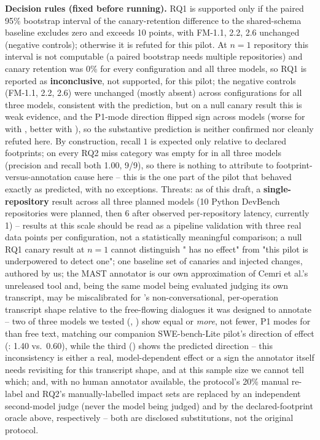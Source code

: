 \noindent\textbf{Decision rules (fixed before running).} RQ1 is supported only
if the paired 95\% bootstrap interval of the canary-retention difference to the
shared-schema baseline excludes zero and exceeds 10 points, with FM-1.1,
2.2, 2.6 unchanged (negative controls); otherwise it is refuted for this
pilot. At $n=1$ repository this interval is not computable (a paired
bootstrap needs multiple repositories) and canary retention was 0\% for
every configuration and all three models, so RQ1 is reported as
\textbf{inconclusive}, not supported, for this pilot; the negative controls
(FM-1.1, 2.2, 2.6) were unchanged (mostly absent) across configurations for
all three models, consistent with the prediction, but on a null canary
result this is weak evidence, and the P1-mode direction flipped sign
across models (worse for \tool{} with , better with
), so the substantive prediction is neither
confirmed nor cleanly refuted here. By construction, recall $1$ is
expected only relative to declared footprints; on  every
RQ2 miss category was empty for \tool{} in all three models (precision and
recall both 1.00, 9/9), so there is nothing to attribute to
footprint-versus-annotation cause here -- this is the one part of the
pilot that behaved exactly as predicted, with no exceptions. Threats: as
of this draft, a \textbf{single-repository} result across all three
planned models (10 Python DevBench repositories were planned, then 6 after
observed per-repository latency, currently 1) -- results at this scale
should be read as a pipeline validation with three real data points per
configuration, not a statistically meaningful comparison; a null RQ1
canary result at $n=1$ cannot distinguish "\tool{} has no effect" from
"this pilot is underpowered to detect one"; one baseline set of canaries
and injected changes, authored by us; the MAST annotator is our own
approximation of Cemri et al.'s unreleased tool and, being the same model
being evaluated judging its own transcript, may be miscalibrated for
\tool{}'s non-conversational, per-operation transcript shape relative to
the free-flowing dialogues it was designed to annotate -- two of three
models we tested (, ) show equal
or \emph{more}, not fewer, P1 modes for \tool{} than free text, matching
our companion SWE-bench-Lite pilot's direction of effect
(: 1.40 vs.\ 0.60), while the
third () shows the predicted direction -- this
inconsistency is either a real, model-dependent effect or a sign the
annotator itself needs revisiting for this transcript shape, and at this
sample size we cannot tell which; and, with no human annotator available,
the protocol's 20\% manual re-label and RQ2's manually-labelled impact
sets are replaced by an independent second-model judge (never the model
being judged) and by the declared-footprint oracle above, respectively --
both are disclosed substitutions, not the original protocol.

